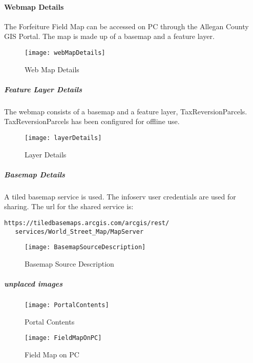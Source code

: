 \documentclass[class=article , crop=false, titlepage, twoside, multi={itemize, figure, verbatim}, float=false]{standalone}
\begin{document}
\clearpage
\paragraph{Webmap Details}The Forfeiture Field Map can be accessed on PC through the Allegan County GIS Portal.  The map is made up of a basemap and a feature layer.
\begin{figure}[h!]
\centering
\texttt{[image: webMapDetails]}
\caption{Web Map Details}
\end{figure}

\subparagraph{Feature Layer Details}The webmap consists of a basemap and a feature layer, TaxReversionParcels.  TaxReversionParcels has been configured for offline use.
\begin{figure}[h!]
\centering
\texttt{[image: layerDetails]}
\caption{Layer Details}
\end{figure}
\clearpage







\subparagraph{Basemap Details}A tiled basemap service is used.  The infoserv user credentials are used for sharing.  The url for the shared service is:
\begin{verbatim}
https://tiledbasemaps.arcgis.com/arcgis/rest/
   services/World_Street_Map/MapServer
\end{verbatim}
\begin{figure}[h!]
\centering
\texttt{[image: BasemapSourceDescription]}
\caption{Basemap Source Description}
\end{figure}
\clearpage


\subparagraph{unplaced images}
\begin{figure}[h!]
\centering
\texttt{[image: PortalContents]}
\caption{Portal Contents}
\end{figure}

\begin{figure}[h!]
\centering
\texttt{[image: FieldMapOnPC]}
\caption{Field Map on PC}
\end{figure}
\end{document}
